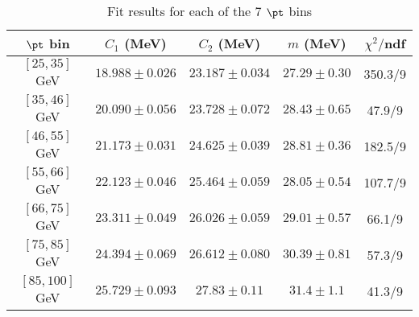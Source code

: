 \begin{table}[h!]
\centering
\begin{tabular}{c||c|c|c||c}
$\pt$ bin & $C_1$ (MeV) & $C_2$ (MeV) & $m$ (MeV) & $\chi^2/$ndf \\
\hline
$[25, 35]$ GeV & $18.988\pm0.026$ & $23.187\pm0.034$ & $27.29\pm0.30$ & 350.3/9\\
$[35, 46]$ GeV & $20.090\pm0.056$ & $23.728\pm0.072$ & $28.43\pm0.65$ & 47.9/9\\
$[46, 55]$ GeV & $21.173\pm0.031$ & $24.625\pm0.039$ & $28.81\pm0.36$ & 182.5/9\\
$[55, 66]$ GeV & $22.123\pm0.046$ & $25.464\pm0.059$ & $28.05\pm0.54$ & 107.7/9\\
$[66, 75]$ GeV & $23.311\pm0.049$ & $26.026\pm0.059$ & $29.01\pm0.57$ & 66.1/9\\
$[75, 85]$ GeV & $24.394\pm0.069$ & $26.612\pm0.080$ & $30.39\pm0.81$ & 57.3/9\\
$[85, 100]$ GeV & $25.729\pm0.093$ & $27.83\pm0.11$ & $31.4\pm1.1$ & 41.3/9\\
\end{tabular}
\caption{Fit results for each of the 7 $\pt$ bins}
\label{t:fit}
\end{table}
